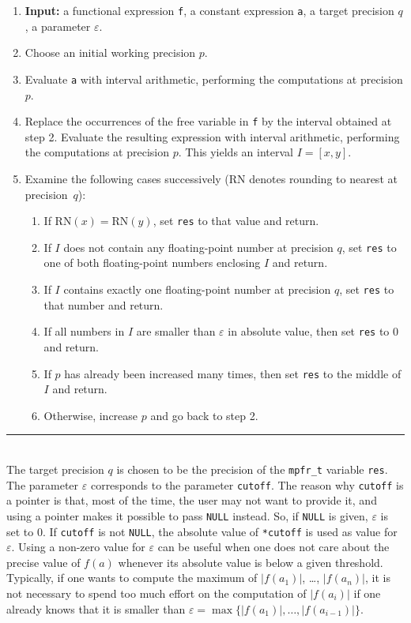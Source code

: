 \documentclass[a4paper]{article}
\begin{document}
\begin{enumerate}
\item[~]\textbf {Input:} a functional expression \verb|f|, a constant expression \verb|a|, a target precision $q$, a parameter $\varepsilon$.
\item Choose an initial working precision $p$.
\item Evaluate \verb|a| with interval arithmetic, performing the computations at precision $p$.
\item Replace the occurrences of the free variable in \verb|f| by the interval obtained at step 2. Evaluate the resulting expression with interval arithmetic, performing the computations at precision $p$. This yields an interval $I = [x,y]$.
\item Examine the following cases successively ($\mathrm{RN}$ denotes rounding to nearest at precision~$q$):
  \begin{enumerate}
  \item If $\mathrm{RN}(x) = \mathrm{RN}(y)$, set \verb|res| to that value and return.
  \item If $I$ does not contain any floating-point number at precision $q$, set \verb|res| to one of both floating-point numbers enclosing $I$ and return.
  \item If $I$ contains exactly one floating-point number at precision $q$, set \verb|res| to that number and return.
  \item If all numbers in $I$ are smaller than $\varepsilon$ in absolute value, then set \verb|res| to $0$ and return.
  \item If $p$ has already been increased many times, then set \verb|res| to the middle of $I$ and return.
  \item Otherwise, increase $p$ and go back to step 2.
  \end{enumerate}
\end{enumerate}
\vspace{-0.2cm}
\rule{\textwidth}{0.5px}\\[0.7cm]
The target precision $q$ is chosen to be the precision of the \verb|mpfr_t| variable \verb|res|. The parameter $\varepsilon$ corresponds to the parameter \verb|cutoff|. The reason why \verb|cutoff| is a pointer is that, most of the time, the user may not want to provide it, and using a pointer makes it possible to pass \verb|NULL| instead. So, if \verb|NULL| is given, $\varepsilon$ is set to $0$. If \verb|cutoff| is not \verb|NULL|, the absolute value of \verb|*cutoff| is used as value for $\varepsilon$. Using a non-zero value for $\varepsilon$ can be useful when one does not care about the precise value of $f(a)$ whenever its absolute value is below a given threshold. Typically, if one wants to compute the maximum of $|f(a_1)|$, \dots, $|f(a_n)|$, it is not necessary to spend too much effort on the computation of $|f(a_i)|$ if one already knows that it is smaller than $\varepsilon = \max \{|f(a_1)|,\dots,|f(a_{i-1})|\}$.
\end{document}
